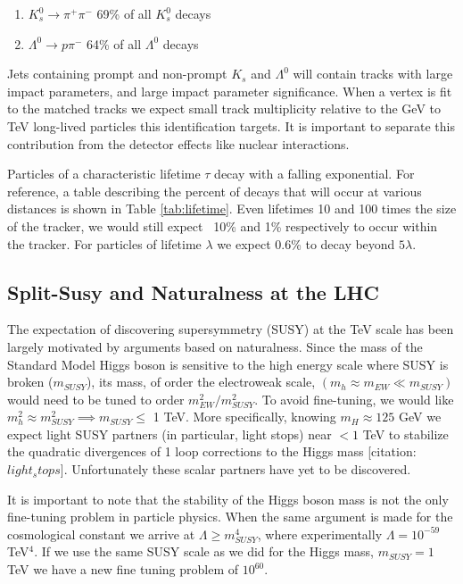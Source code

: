 \begin{enumerate}
\item $K_s^0 \rightarrow \pi^+\pi^-$ 69\% of all $K_s^0$ decays 
\item $\Lambda^0 \rightarrow p \pi^-$ 64\% of all $\Lambda^0$ decays 
\end{enumerate}

Jets containing prompt and non-prompt $K_s$ and $\Lambda^0$ will contain tracks with large impact parameters, 
and large impact parameter significance. When a vertex is fit to the matched tracks we expect small track multiplicity relative 
to the GeV to TeV   long-lived particles this identification targets. It is important to separate this contribution from
the detector effects like nuclear interactions.



Particles of a characteristic lifetime $\tau$ decay with a falling exponential. For reference, 
a table describing the percent of decays that will occur at various distances is shown in Table
 \ref{tab:lifetime}. Even lifetimes 10 and 100 times the size of the tracker, we would still expect
~10\% and 1\% respectively to occur within the tracker. For particles  of lifetime $\lambda$ we
expect 0.6\% to decay beyond $5\lambda$. 



\subsection{Split-Susy and Naturalness at the LHC}

The expectation of discovering supersymmetry (SUSY) at the TeV scale has been largely motivated
 by arguments based on naturalness. 
Since the mass of the Standard Model Higgs boson is sensitive to the high energy scale where SUSY
 is broken ($m_{SUSY}$), its mass, of order the electroweak scale, $(m_h \approx m_{EW} \ll m_{SUSY})$
 would need to be tuned to order $m_{EW}^2/m_{SUSY}^2$. 
To avoid fine-tuning, we would like  $m_h^2 \approx m_{SUSY}^2 \implies m_{SUSY} \leq$ 1 TeV. 
More specifically, knowing $m_H \approx 125$ GeV we expect light SUSY partners (in particular, light stops)
 near $< 1$ TeV to stabilize the quadratic divergences of 1 loop corrections to the Higgs mass
 [citation:$light_stops$]. 
Unfortunately these scalar partners have yet to be discovered.

It is important to note that the stability of the Higgs boson mass is not the only
 fine-tuning problem in particle physics. 
When the same argument is made for the cosmological constant we arrive at $\Lambda \geq m_{SUSY}^4$, 
where experimentally $\Lambda = 10^{-59}$ TeV$^4$.   
If we use the same SUSY scale as we did for the Higgs mass,
 $m_{SUSY} = 1$ TeV we have a new fine tuning problem of $10^{60}$.

